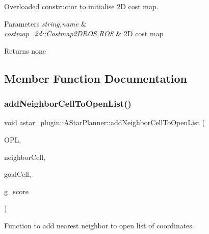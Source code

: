 Overloaded constructor to initialise 2D cost map. 


\begin{DoxyParams}{Parameters}
{\em string,name} & \\
\hline
{\em costmap\+\_\+2d\+::\+Costmap2\+D\+R\+OS,R\+OS} & 2D cost map \\
\hline
\end{DoxyParams}
\begin{DoxyReturn}{Returns}
none 
\end{DoxyReturn}


\subsection{Member Function Documentation}
\mbox{\label{classastar__plugin_1_1_a_star_planner_a2d44c51604b31cd5f7e8599520ae3645}} 
\subsubsection{\texorpdfstring{add\+Neighbor\+Cell\+To\+Open\+List()}{addNeighborCellToOpenList()}}
{\footnotesize\ttfamily void astar\+\_\+plugin\+::\+A\+Star\+Planner\+::add\+Neighbor\+Cell\+To\+Open\+List (\begin{DoxyParamCaption}\item[{std\+::set$<$ \hyperlink{class_grid_square}{Grid\+Square} $>$ \&}]{O\+PL,  }\item[{int}]{neighbor\+Cell,  }\item[{int}]{goal\+Cell,  }\item[{std\+::vector$<$ float $>$}]{g\+\_\+score }\end{DoxyParamCaption})}



Function to add nearest neighbor to open list of coordinates. 


